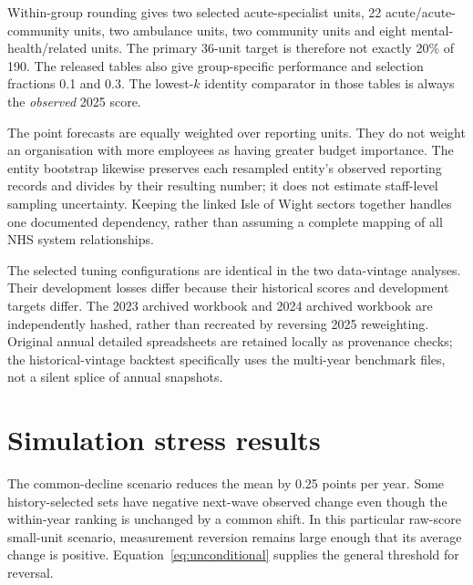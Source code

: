 \documentclass[11pt,letterpaper]{article}
\begin{document}
Within-group rounding gives two selected acute-specialist units, 22 acute/acute-community units, two ambulance units, two community units and eight mental-health/related units. The primary 36-unit target is therefore not exactly 20\% of 190. The released tables also give group-specific performance and selection fractions 0.1 and 0.3. The lowest-$k$ identity comparator in those tables is always the \emph{observed} 2025 score.

The point forecasts are equally weighted over reporting units. They do not weight an organisation with more employees as having greater budget importance. The entity bootstrap likewise preserves each resampled entity's observed reporting records and divides by their resulting number; it does not estimate staff-level sampling uncertainty. Keeping the linked Isle of Wight sectors together handles one documented dependency, rather than assuming a complete mapping of all NHS system relationships.

The selected tuning configurations are identical in the two data-vintage analyses. Their development losses differ because their historical scores and development targets differ. The 2023 archived workbook and 2024 archived workbook are independently hashed, rather than recreated by reversing 2025 reweighting. Original annual detailed spreadsheets are retained locally as provenance checks; the historical-vintage backtest specifically uses the multi-year benchmark files, not a silent splice of annual snapshots.

\section{Simulation stress results}\label{app:stress}
\begin{table}[htbp]
\centering\scriptsize\setlength{\tabcolsep}{3pt}

\caption{Prespecified stress slice, $n$ in 20--120, $\phi=0.85$, $\sigma^2=6.25$ and selection fraction 0.2. Each stress has 5,000 independent panels. The Gaussian rule is correctly specified in the known-common-decline and strong-error-correlation cells, and a working rule under heavy tails or unmodelled persistent response bias. Trends are known to the simulation rules; these numbers do not demonstrate empirical trend estimation.}
\end{table}

The common-decline scenario reduces the mean by 0.25 points per year. Some history-selected sets have negative next-wave observed change even though the within-year ranking is unchanged by a common shift. In this particular raw-score small-unit scenario, measurement reversion remains large enough that its average change is positive. Equation~\eqref{eq:unconditional} supplies the general threshold for reversal.
\end{document}

